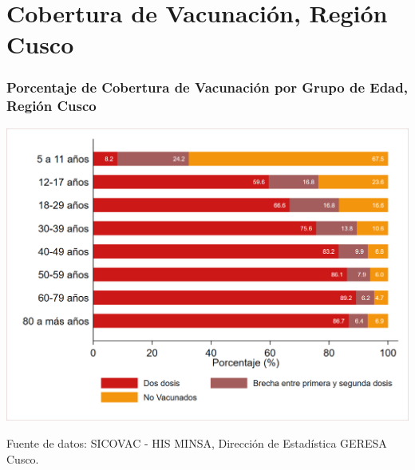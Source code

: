 \documentclass[xcolor=table]{beamer}
\begin{document}
\section{Cobertura de Vacunación, Región Cusco}

\begin{frame}[label=cobertura_vacuna]
	\frametitle{Porcentaje de Cobertura de Vacunación por Grupo de Edad, Región Cusco}
	\vspace{-.5cm}
	\begin{center}
		\includegraphics[width=0.8\linewidth, trim={.2cm .5cm .2cm .2cm},clip]{../figuras/vacunacion_grupo_edad.png}
	\end{center}
	{\tiny Fuente de datos: SICOVAC - HIS MINSA, Dirección de Estadística GERESA Cusco.} 
\end{frame}
\end{document}
